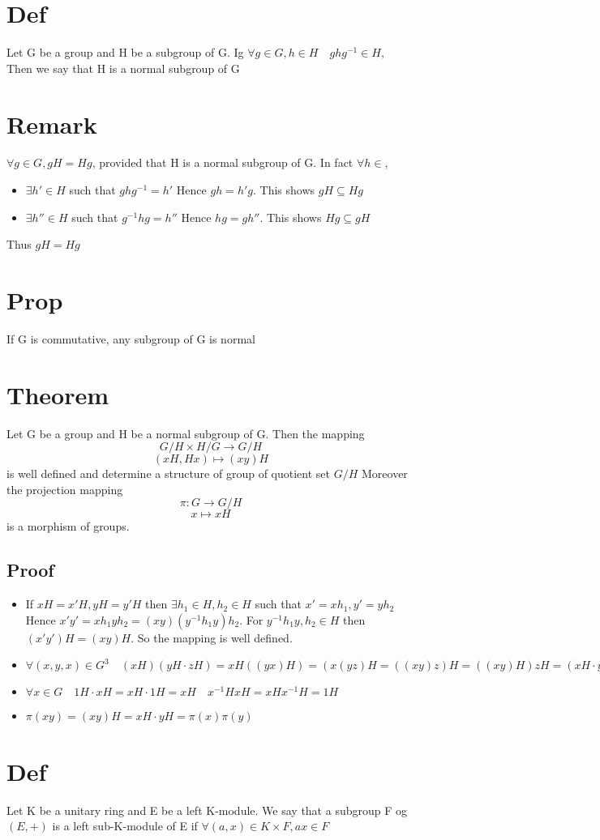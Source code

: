 \documentclass{book}
\begin{document}
\section{Def}
Let G be a group and H be a subgroup of G. Ig $\forall g\in G,h\in H\quad ghg^{-1}\in H,$ Then we say that H is a normal subgroup of G
\section{Remark}
$\forall g\in G, gH=Hg$, provided that H is a normal subgroup of G. In fact $\forall h\in $,\begin{itemize}
    \item $\exists h'\in H$ such that $ghg^{-1}=h'$ Hence $gh=h'g$. This shows $gH\subseteq Hg$
    \item $\exists h''\in H$ such that $g^{-1}hg=h''$ Hence $hg=gh''$. This shows $Hg\subseteq gH$
\end{itemize}
Thus $gH=Hg$
\section{Prop}
If G is commutative, any subgroup of G is normal
\section{Theorem}
Let G be a group and H be a normal subgroup of G. Then the mapping $$G/ H\times H/ G\rightarrow G/ H$$$$(xH,Hx)\mapsto(xy)H$$
is well defined and determine a structure of group of quotient set $G/ H$ Moreover the projection mapping $$\pi:G\rightarrow G/ H$$$$ x\mapsto xH$$ is a morphism of groups.
\subsection{Proof}
\begin{itemize}
    \item If $xH=x'H,yH=y'H$ then $\exists h_1\in H,h_2\in H$ such that $x'=xh_1,y'=yh_2$ Hence $x'y'=xh_1yh_2=(xy)(y^{-1}h_1y)h_2$. For $y^{-1}h_1y,h_2\in H$ then $(x'y')H=(xy)H.$ So the mapping is well defined.
    \item $\forall (x,y,x)\in G^3\quad (xH)(yH\cdot zH)=xH((yx)H)=(x(yz)H=((xy)z)H=((xy)H)zH=(xH\cdot yH)zH)$
    \item $\forall x\in G\quad 1H\cdot xH=xH\cdot 1H=xH\quad x^{-1}HxH=xHx^{-1}H=1H$
    \item $\pi(xy)=(xy)H=xH\cdot yH=\pi(x)\pi(y)$
\end{itemize}
\section{Def}
Let K be a unitary ring and E be a left K-module. We say that a subgroup F og $(E,+)$ is a left sub-K-module of E if $\forall(a,x)\in K\times F, ax\in F$
\end{document}
